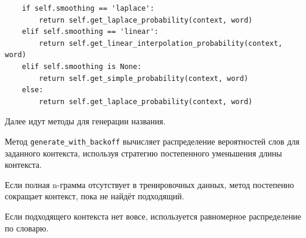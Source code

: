 \documentclass[coursework]{SCWorks}
\begin{document}
\begin{enumerate}
\begin{verbatim}
    if self.smoothing == 'laplace':
        return self.get_laplace_probability(context, word)
    elif self.smoothing == 'linear':
        return self.get_linear_interpolation_probability(context, word)
    elif self.smoothing is None:
        return self.get_simple_probability(context, word)
    else:
        return self.get_laplace_probability(context, word)
        \end{verbatim}
    \end{enumerate}

    Далее идут методы для генерации названия.

    Метод \texttt{generate\_with\_backoff} вычисляет распределение вероятностей слов для заданного контекста,
    используя стратегию постепенного уменьшения длины контекста.

    Если полная n-грамма отсутствует в тренировочных данных, метод постепенно сокращает контекст, пока не найдёт подходящий.

    Если подходящего контекста нет вовсе, используется равномерное распределение по словарю.
\end{document}
